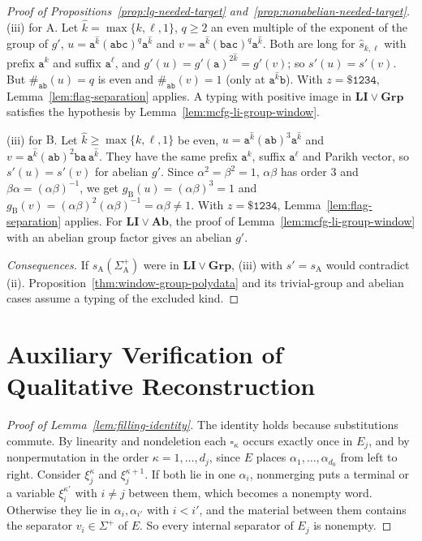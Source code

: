 \documentclass[11pt]{article}
\numberwithin{equation}{section}
\theoremstyle{plain}
\theoremstyle{definition}
\theoremstyle{remark}
\newcommand{\blank}{\square}
\theoremstyle{plain}
\begin{document}
\begin{proof}[Proof of Propositions~\ref{prop:lg-needed-target}
and~\ref{prop:nonabelian-needed-target}]
(iii) for $\mathrm A$.  Let $\hat k=\max\{k,\ell,1\}$, $q\ge2$ an even multiple of the
exponent of the group of $g'$, $u=\mathtt a^{\hat k}(\mathtt{abc})^q\mathtt a^{\hat k}$
and $v=\mathtt a^{\hat k}(\mathtt{bac})^q\mathtt a^{\hat k}$.  Both are long for
$\widehat s_{k,\ell}$ with prefix $\mathtt a^k$ and suffix $\mathtt a^\ell$, and
$g'(u)=g'(\mathtt a)^{2\hat k}=g'(v)$; so $s'(u)=s'(v)$.  But $\#_{\mathtt{ab}}(u)=q$ is
even and $\#_{\mathtt{ab}}(v)=1$ (only at $\mathtt a^{\hat k}\mathtt b$).  With
$z=\mathtt{\$1234}$, Lemma~\ref{lem:flag-separation} applies.  A typing with positive
image in $\mathbf{LI}\vee\mathbf{Grp}$ satisfies the hypothesis by
Lemma~\ref{lem:mcfg-li-group-window}.

(iii) for $\mathrm B$.  Let $\hat k\ge\max\{k,\ell,1\}$ be even,
$u=\mathtt a^{\hat k}(\mathtt{ab})^3\mathtt a^{\hat k}$ and
$v=\mathtt a^{\hat k}(\mathtt{ab})^2\mathtt{ba}\,\mathtt a^{\hat k}$.  They have the same
prefix $\mathtt a^k$, suffix $\mathtt a^\ell$ and Parikh vector, so $s'(u)=s'(v)$ for abelian
$g'$.  Since $\alpha^2=\beta^2=1$, $\alpha\beta$ has order $3$ and
$\beta\alpha=(\alpha\beta)^{-1}$, we get $g_{\mathrm B}(u)=(\alpha\beta)^3=1$ and
$g_{\mathrm B}(v)=(\alpha\beta)^2(\alpha\beta)^{-1}=\alpha\beta\ne1$.  With
$z=\mathtt{\$1234}$, Lemma~\ref{lem:flag-separation} applies.  For
$\mathbf{LI}\vee\mathbf{Ab}$, the proof of Lemma~\ref{lem:mcfg-li-group-window} with
an abelian group factor gives an abelian $g'$.

\emph{Consequences.}  If $s_{\mathrm A}(\Sigma_{\mathrm A}^+)$ were in
$\mathbf{LI}\vee\mathbf{Grp}$, (iii) with $s'=s_{\mathrm A}$ would contradict (ii).
Proposition~\ref{thm:window-group-polydata} and its trivial-group and abelian cases
assume a typing of the excluded kind.
\end{proof}

\section{Auxiliary Verification of Qualitative Reconstruction}
\label{app:qualitative-construction-details}

\begin{proof}[Proof of Lemma~\ref{lem:filling-identity}]
The identity holds because substitutions commute.  By linearity and
nondeletion each $\blank_\kappa$ occurs exactly once in $E_j$, and by
nonpermutation in the order $\kappa=1,\ldots,d_j$, since $E$ places
$\alpha_1,\ldots,\alpha_{d_0}$ from left to right.  Consider $\xi_j^\kappa$ and
$\xi_j^{\kappa+1}$.  If both lie in one $\alpha_i$, nonmerging puts a terminal
or a variable $\xi_i^{\kappa'}$ with $i\ne j$ between them, which becomes a
nonempty word.  Otherwise they lie in $\alpha_i,\alpha_{i'}$ with $i<i'$, and
the material between them contains the separator $v_i\in\Sigma^+$ of $E$.  So
every internal separator of $E_j$ is nonempty.
\end{proof}
\end{document}
